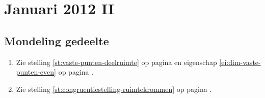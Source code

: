 \documentclass[main.tex]{subfiles}
\begin{document}


\section{Januari 2012 II}
\subsection*{Mondeling gedeelte}
\begin{enumerate}
\item Zie stelling \ref{st:vaste-punten-deelruimte} op pagina \pageref{st:vaste-punten-deelruimte} en eigenschap \ref{ei:dim-vaste-punten-even} op pagina \pageref{ei:dim-vaste-punten-even}.
\item Zie stelling \ref{st:congruentiestelling-ruimtekrommen} op pagina \pageref{st:congruentiestelling-ruimtekrommen}.
\end{enumerate}
\end{document}
